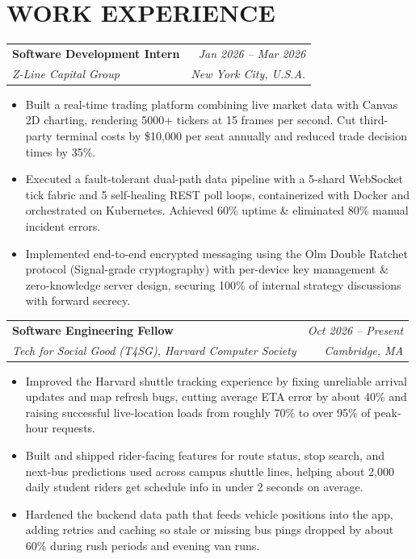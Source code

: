 \documentclass[letterpaper,8pt]{extarticle}
\makeatletter
\newcommand{\resumeSubheading}[4]{%
  \vspace{2.4pt}%
  \begin{tabular*}{\textwidth}[t]{@{\extracolsep{\fill}}l r@{}}
    \textbf{#1} & \textit{#2} \\[0.7pt]
    \textit{#3} & \textit{#4} \\
  \end{tabular*}%
  \vspace{1.4pt}%
}
\makeatother
\begin{document}
\section{WORK EXPERIENCE}
\resumeSubheading
  {Software Development Intern}{Jan 2026 -- Mar 2026}
  {Z-Line Capital Group}{New York City, U.S.A.}
\begin{itemize}
  \item Built a real-time trading platform combining live market data with Canvas 2D charting, rendering 5000+ tickers at 15 frames per second. Cut third-party terminal costs by \$10,000 per seat annually and reduced trade decision times by 35\%.
  \item Executed a fault-tolerant dual-path data pipeline with a 5-shard WebSocket tick fabric and 5 self-healing REST poll loops, containerized with Docker and orchestrated on Kubernetes. Achieved 60\% uptime \& eliminated 80\% manual incident errors.
  \item Implemented end-to-end encrypted messaging using the Olm Double Ratchet protocol (Signal-grade cryptography) with per-device key management \& zero-knowledge server design, securing 100\% of internal strategy discussions with forward secrecy.
\end{itemize}

\resumeSubheading
  {Software Engineering Fellow}{Oct 2026 -- Present}
  {Tech for Social Good (T4SG), Harvard Computer Society}{Cambridge, MA}
\begin{itemize}
  \item Improved the Harvard shuttle tracking experience by fixing unreliable arrival updates and map refresh bugs, cutting average ETA error by about 40\% and raising successful live-location loads from roughly 70\% to over 95\% of peak-hour requests.
  \item Built and shipped rider-facing features for route status, stop search, and next-bus predictions used across campus shuttle lines, helping about 2,000 daily student riders get schedule info in under 2 seconds on average.
  \item Hardened the backend data path that feeds vehicle positions into the app, adding retries and caching so stale or missing bus pings dropped by about 60\% during rush periods and evening van runs.
\end{itemize}
\end{document}
